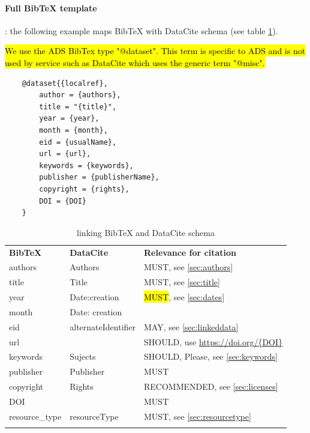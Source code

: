 \documentclass[11pt,a4paper]{ivoa}
\begin{document}
\paragraph{Full BibTeX template} : the following example maps BibTeX with DataCite schema (see table \ref{tab:tex}).

\hl{We use the ADS BibTex type "@dataset". This term is specific to ADS and is not used by service such as DataCite which uses the generic term "@misc".} %

\begin{lstlisting}
	@dataset{{localref},
		author = {authors},
		title = "{title}",
		year = {year},
		month = {month},
		eid = {usualName},
		url = {url},
		keywords = {keywords},
		publisher = {publisherName},
		copyright = {rights},
		DOI = {DOI}
	}
\end{lstlisting}


\begin{table}[th]
	\begin{tabular}{lll}
		\sptablerule
		\textbf{BibTeX} & \textbf{DataCite} & \textbf{Relevance for citation} \\
		\sptablerule
		\sptablerule
	authors & Authors & MUST, see \ref{sec:authors} \\
	title & Title & MUST, see \ref{sec:title}\\
	year &  Date:creation & \hl{MUST}, see \ref{sec:dates} \\
	month & Date: creation & \\
	eid & alternateIdentifier & MAY, see \ref{sec:linkeddata}\\
	url & & SHOULD, use \url{https://doi.org/{DOI}} \\
	keywords & Sujects & SHOULD, Please, see \ref{sec:keywords} \\
	publisher & Publisher & MUST \\
    copyright & Rights & RECOMMENDED, see \ref{sec:licenses} \\
    DOI & & MUST \\
    resource\_type  & resourceType & MUST, see \ref{sec:resourcetype}\\
    \sptablerule
	\end{tabular}%
\caption{\label{tab:tex}linking BibTeX and DataCite schema}
\end{table}
\end{document}
